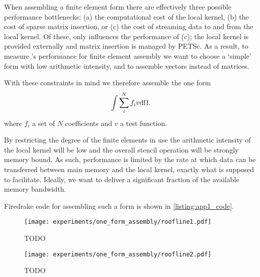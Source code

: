 \documentclass[thesis]{subfiles}
\begin{document}


When assembling a finite element form there are effectively three possible performance bottlenecks:
(a) the computational cost of the local kernel,
(b) the cost of sparse matrix insertion, or
(c) the cost of streaming data to and from the local kernel.
Of these,  only influences the performance of (c); the local kernel is provided externally and matrix insertion is managed by PETSc.
As a result, to measure 's performance for finite element assembly we want to choose a `simple' form with low arithmetic intensity, and to assemble vectors instead of matrices.

With these constraints in mind we therefore assemble the one form
\begin{equation}
  \label{eq:app1_form}
  \int \sum_i^N f_i v \textnormal{d}\Omega.
\end{equation}
where $f_i$ a set of $N$ coefficients and $v$ a test function.

By restricting the degree of the finite elements in use the arithmetic intensity of the local kernel will be low and the overall stencil operation will be strongly memory bound.
As such, performance is limited by the rate at which data can be transferred between main memory and the local kernel, exactly what  is supposed to facilitate.
Ideally, we want  to deliver a significant fraction of the available memory bandwidth.

Firedrake code for assembling such a form is shown in \cref{listing:app1_code}.



\begin{figure}
  \centering
  \texttt{[image: experiments/one\_form\_assembly/roofline1.pdf]}
  \caption{TODO}
  \label{fig:app1_roofline1}
\end{figure}

\begin{figure}
  \centering
  \texttt{[image: experiments/one\_form\_assembly/roofline2.pdf]}
  \caption{TODO}
  \label{fig:app1_roofline2}
\end{figure}
\end{document}
